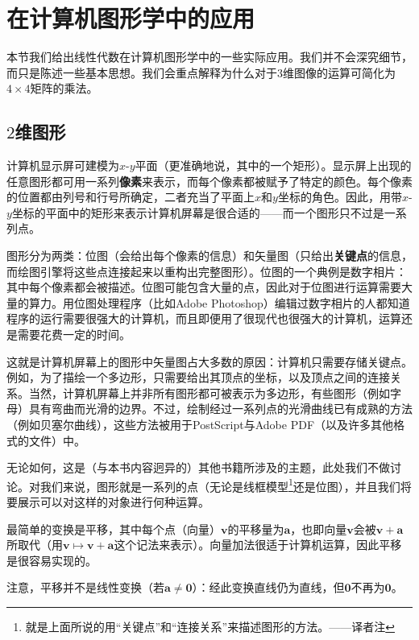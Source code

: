 \section{在计算机图形学中的应用}

本节我们给出线性代数在计算机图形学中的一些实际应用。我们并不会深究细节，而只是陈述一些基本思想。我们会重点解释为什么对于$3$维图像的运算可简化为$4\times 4$矩阵的乘法。

\subsection{\texorpdfstring{$2$}{2}维图形}

计算机显示屏可建模为$x$-$y$平面（更准确地说，其中的一个矩形）。显示屏上出现的任意图形都可用一系列{\bf 像素}来表示，而每个像素都被赋予了特定的颜色。每个像素的位置都由列号和行号所确定，二者充当了平面上$x$和$y$坐标的角色。因此，用带$x$-$y$坐标的平面中的矩形来表示计算机屏幕是很合适的——而一个图形只不过是一系列点。

\begin{remark*}
    图形分为两类：位图（会给出每个像素的信息）和矢量图（只给出{\bf 关键点}的信息，而绘图引擎将这些点连接起来以重构出完整图形）。位图的一个典例是数字相片：其中每个像素都会被描述。位图可能包含大量的点，因此对于位图进行运算需要大量的算力。用位图处理程序（比如Adobe Photoshop）编辑过数字相片的人都知道程序的运行需要很强大的计算机，而且即便用了很现代也很强大的计算机，运算还是需要花费一定的时间。

    这就是计算机屏幕上的图形中矢量图占大多数的原因：计算机只需要存储关键点。例如，为了描绘一个多边形，只需要给出其顶点的坐标，以及顶点之间的连接关系。当然，计算机屏幕上并非所有图形都可被表示为多边形，有些图形（例如字母）具有弯曲而光滑的边界。不过，绘制经过一系列点的光滑曲线已有成熟的方法（例如贝塞尔曲线），这些方法被用于PostScript与Adobe PDF（以及许多其他格式的文件）中。

    无论如何，这是（与本书内容迥异的）其他书籍所涉及的主题，此处我们不做讨论。对我们来说，图形就是一系列的点（无论是线框模型\footnote{就是上面所说的用“关键点”和“连接关系”来描述图形的方法。——译者注}还是位图），并且我们将要展示可以对这样的对象进行何种运算。
\end{remark*}

最简单的变换是平移，其中每个点（向量）$\mathbf{v}$的平移量为$\mathbf{a}$，也即向量$\mathbf{v}$会被$\mathbf{v}+\mathbf{a}$所取代（用$\mathbf{v}\mapsto\mathbf{v}+\mathbf{a}$这个记法来表示）。向量加法很适于计算机运算，因此平移是很容易实现的。

注意，平移并不是线性变换（若$\mathbf{a}\ne\mathbf{0}$）：经此变换直线仍为直线，但$\mathbf{0}$不再为$\mathbf{0}$。

